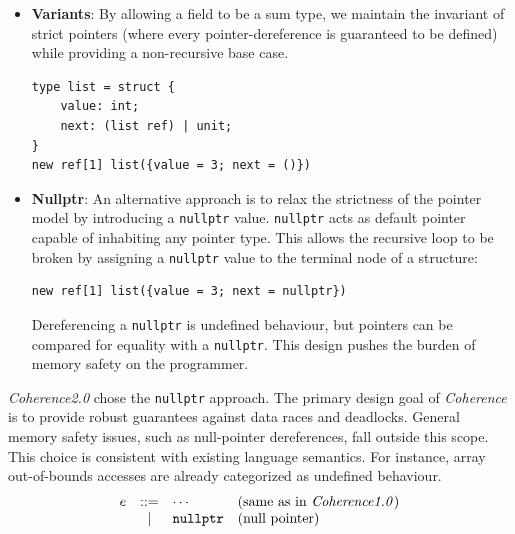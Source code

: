 \documentclass[a4paper,12pt,fleqn]{article}
\begin{document}
\begin{itemize}
  \item \textbf{Variants}: By allowing a field to be a sum type, we maintain the invariant of strict pointers (where every pointer-dereference is guaranteed to be defined) while providing a non-recursive base case.
  \begin{lstlisting}
type list = struct {
    value: int;
    next: (list ref) | unit;
}
new ref[1] list({value = 3; next = ()})
\end{lstlisting}
  \item \textbf{Nullptr}: An alternative approach is to relax the strictness of the pointer model by introducing a \texttt{nullptr} value. \texttt{nullptr} acts as default pointer capable of inhabiting any pointer type. This allows the recursive loop to be broken by assigning a \texttt{nullptr} value to the terminal node of a structure:
  \begin{lstlisting}
new ref[1] list({value = 3; next = nullptr})
  \end{lstlisting}
  Dereferencing a \texttt{nullptr} is undefined behaviour, but pointers can be compared for equality with a \texttt{nullptr}. This design pushes the burden of memory safety on the programmer.
\end{itemize}
\textit{Coherence2.0} chose the \texttt{nullptr} approach. The primary design goal of \textit{Coherence} is to provide robust guarantees against data races and deadlocks. General memory safety issues, such as null-pointer dereferences, fall outside this scope. This choice is consistent with existing language semantics. For instance, array out-of-bounds accesses are already categorized as undefined behaviour.
\[
\begin{array}{lcll}
e & ::= & \cdots & \text{(same as in \textit{Coherence1.0})} \\
  & \mid & \mathtt{nullptr} & \text{(null pointer)} \\
\end{array}
\]
\end{document}
